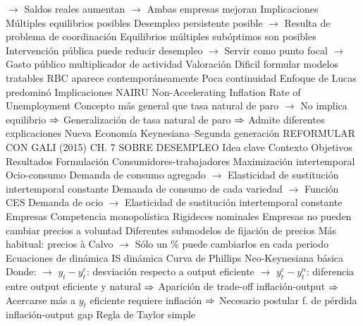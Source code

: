 \documentclass{nuevotema}
\begin{document}
\begin{esquemal}
				\4[] $\to$ Saldos reales aumentan
				\4[] $\to$ Ambas empresas mejoran
				\4 Implicaciones
				\4[] Múltiples equilibrios posibles
				\4[] Desempleo persistente posible
				\4[] $\to$ Resulta de problema de coordinación
				\4[] Equilibrios múltiples subóptimos son posibles
				\4[] Intervención pública puede reducir desempleo
				\4[] $\to$ Servir como punto focal
				\4[] $\to$ Gasto público multiplicador de actividad
				\4 Valoración
				\4[] Dificil formular modelos tratables
				\4[] RBC aparece contemporáneamente
				\4[] Poca continuidad
				\4[] Enfoque de Lucas predominó
			\3 Implicaciones
				\4 NAIRU
				\4[] Non-Accelerating Inflation Rate of Unemployment
				\4[] Concepto más general que tasa natural de paro
				\4[] $\to$ No implica equilibrio
				\4[] $\Rightarrow$ Generalización de tasa natural de paro
				\4[] $\Rightarrow$ Admite diferentes explicaciones
		\2 Nueva Economía Keynesiana--Segunda generación
			\3 REFORMULAR CON GALI (2015) CH. 7  SOBRE DESEMPLEO
			\3 Idea clave
				\4 Contexto
				\4 Objetivos
				\4 Resultados
			\3 Formulación
				\4 Consumidores-trabajadores
				\4[] Maximización intertemporal
				\4[] Ocio-consumo
				\4[] Demanda de consumo agregado
				\4[] $\to$ Elasticidad de sustitución intertemporal constante
				\4[] Demanda de consumo de cada variedad
				\4[] $\to$ Función CES
				\4[] Demanda de ocio
				\4[] $\to$ Elasticidad de sustitución intertemporal constante
				\4 Empresas
				\4[] Competencia monopolística
				\4 Rigideces nominales
				\4[] Empresas no pueden cambiar precios a voluntad
				\4[] Diferentes submodelos de fijación de precios
				\4[] Más habitual: precios à Calvo
				\4[] $\to$ Sólo un \% puede cambiarlos en cada periodo
				\4 Ecuaciones de dinámica
				\4[DIS] IS dinámica
				\4[] 
				\4[NKPC] Curva de Phillips Neo-Keynesiana básica
				\4[] 
				\4[] Donde:
				\4[] $\to$ $y_t - y^e_t$: desviación respecto a output eficiente
				\4[] $\to$ $y^e_t - y^n_t$: diferencia entre output eficiente y natural
				\4[] $\Rightarrow$ Aparición de trade-off inflación-output
				\4[] $\Rightarrow$ Acercarse más a $y_t$ eficiente requiere inflación
				\4[] $\Rightarrow$ Necesario postular f. de pérdida inflación-output gap
				\4[TR] Regla de Taylor simple
				\4[] 

\end{esquemal}
\end{document}
